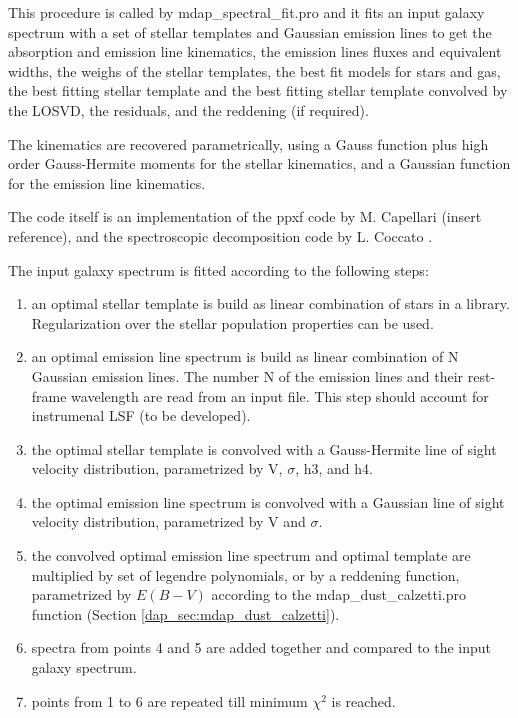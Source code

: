 \documentclass[11pt]{book}
\begin{document}
This procedure is called by mdap\_spectral\_fit.pro and it fits an
input galaxy spectrum with a set of stellar templates and Gaussian
emission lines to get the absorption and emission line kinematics, the
emission lines fluxes and equivalent widths, the weighs of the stellar
templates, the best fit models for stars and gas, the best fitting
stellar template and the best fitting stellar template convolved by
the LOSVD, the residuals, and the reddening (if required).

The kinematics are recovered parametrically, using a Gauss function
plus high order Gauss-Hermite moments for the stellar kinematics, and
a Gaussian function for the emission line kinematics.

The code itself is an implementation of the ppxf code by M. Capellari
(insert reference), and the spectroscopic decomposition code by
L. Coccato \citep{Coccato+11}.

The input galaxy spectrum is fitted according to the following steps:

\begin{enumerate}

  \item an optimal stellar template is build as linear combination of
    stars in a library. Regularization over the stellar population
    properties can be used.

  \item an optimal emission line spectrum is build as linear
    combination of N Gaussian emission lines. The number N of the
    emission lines and their rest-frame wavelength are read from an
    input file. This step should account for instrumenal LSF (to be
    developed).

  \item the optimal stellar template is convolved with a Gauss-Hermite
    line of sight velocity distribution, parametrized by V, $\sigma$,
    h3, and h4.

  \item the optimal emission line spectrum is convolved with a
    Gaussian line of sight velocity distribution, parametrized by V
    and $\sigma$.

  \item the convolved optimal emission line spectrum and optimal
    template are multiplied by set of legendre polynomials, or by a
    reddening function, parametrized by $E(B-V)$ according to the
    mdap\_dust\_calzetti.pro function (Section
    \ref{dap_sec:mdap_dust_calzetti}).

  \item spectra from points 4 and 5 are added together and compared to
    the input galaxy spectrum.

  \item points from 1 to 6 are repeated till minimum $\chi^2$ is
    reached.

\end{enumerate}
\end{document}
